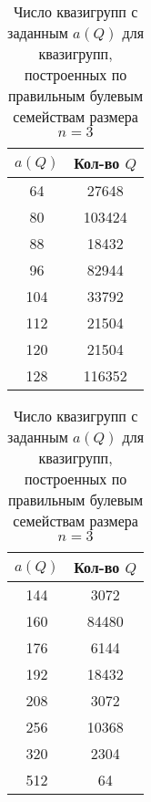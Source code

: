     \begin{table}[h]
        \begin{center}
            \captionsetup{justification=centering} %
            \caption{\label{tab:associdx3} Число квазигрупп с заданным  $a(Q)$ для квазигрупп, построенных по правильным булевым семействам размера $n=3$}
            \begin{minipage}[h]{0.49\linewidth}
                \begin{center}
                    \begin{tabular}{|c|c|}
                        \toprule
                        $a(Q)$ & Кол-во $Q$ \\
                        \midrule
                        64 & 27648 \\
                        80 & 103424 \\
                        88 & 18432 \\
                        96 & 82944 \\
                        104 & 33792 \\
                        112 & 21504 \\
                        120 & 21504 \\
                        128 & 116352 \\
                        \bottomrule
                    \end{tabular}
                \end{center}
            \end{minipage}
            \hfill
            \begin{minipage}[h]{0.49\linewidth}
                \begin{center}
                    \begin{tabular}{|c|c|}
                        \toprule
                        $a(Q)$ & Кол-во $Q$ \\
                        \midrule
                        144 & 3072 \\
                        160 & 84480 \\
                        176 & 6144 \\
                        192 & 18432 \\
                        208 & 3072 \\
                        256 & 10368 \\
                        320 & 2304 \\
                        512 & 64 \\
                        \bottomrule
                    \end{tabular}
                \end{center}
            \end{minipage}
        \end{center}
    \end{table}

